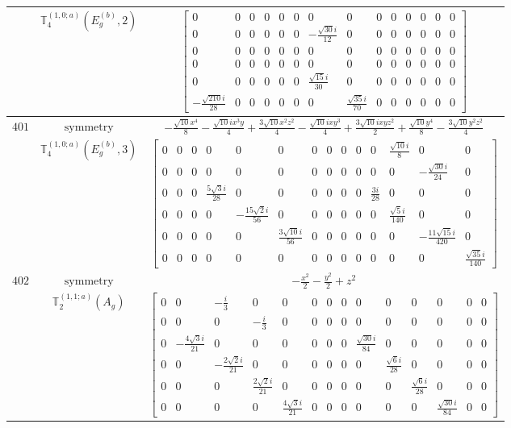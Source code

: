 \documentclass[fleqn,8pt,landscape]{jsarticle}
\begin{document}
\begin{longtable}{ccc}
$  $ & $ \mathbb{T}_{4}^{(1,0;a)}(E_{g}^{(b)},2) $ & $ \begin{bmatrix} 0 & 0 & 0 & 0 & 0 & 0 & 0 & 0 & 0 & 0 & 0 & 0 & 0 & 0 \\ 0 & 0 & 0 & 0 & 0 & 0 & - \frac{\sqrt{30} i}{12} & 0 & 0 & 0 & 0 & 0 & 0 & 0 \\ 0 & 0 & 0 & 0 & 0 & 0 & 0 & 0 & 0 & 0 & 0 & 0 & 0 & 0 \\ 0 & 0 & 0 & 0 & 0 & 0 & 0 & 0 & 0 & 0 & 0 & 0 & 0 & 0 \\ 0 & 0 & 0 & 0 & 0 & 0 & \frac{\sqrt{15} i}{30} & 0 & 0 & 0 & 0 & 0 & 0 & 0 \\ - \frac{\sqrt{210} i}{28} & 0 & 0 & 0 & 0 & 0 & 0 & \frac{\sqrt{35} i}{70} & 0 & 0 & 0 & 0 & 0 & 0 \end{bmatrix} $ \\ \hline
$ 401 $ & $ \text{symmetry} $ & $ - \frac{\sqrt{10} x^{4}}{8} - \frac{\sqrt{10} i x^{3} y}{4} + \frac{3 \sqrt{10} x^{2} z^{2}}{4} - \frac{\sqrt{10} i x y^{3}}{4} + \frac{3 \sqrt{10} i x y z^{2}}{2} + \frac{\sqrt{10} y^{4}}{8} - \frac{3 \sqrt{10} y^{2} z^{2}}{4} $ \\
$  $ & $ \mathbb{T}_{4}^{(1,0;a)}(E_{g}^{(b)},3) $ & $ \begin{bmatrix} 0 & 0 & 0 & 0 & 0 & 0 & 0 & 0 & 0 & 0 & 0 & \frac{\sqrt{10} i}{8} & 0 & 0 \\ 0 & 0 & 0 & 0 & 0 & 0 & 0 & 0 & 0 & 0 & 0 & 0 & - \frac{\sqrt{30} i}{24} & 0 \\ 0 & 0 & 0 & \frac{5 \sqrt{3} i}{28} & 0 & 0 & 0 & 0 & 0 & 0 & \frac{3 i}{28} & 0 & 0 & 0 \\ 0 & 0 & 0 & 0 & - \frac{15 \sqrt{2} i}{56} & 0 & 0 & 0 & 0 & 0 & 0 & \frac{\sqrt{5} i}{140} & 0 & 0 \\ 0 & 0 & 0 & 0 & 0 & \frac{3 \sqrt{10} i}{56} & 0 & 0 & 0 & 0 & 0 & 0 & - \frac{11 \sqrt{15} i}{420} & 0 \\ 0 & 0 & 0 & 0 & 0 & 0 & 0 & 0 & 0 & 0 & 0 & 0 & 0 & \frac{\sqrt{35} i}{140} \end{bmatrix} $ \\ \hline
$ 402 $ & $ \text{symmetry} $ & $ - \frac{x^{2}}{2} - \frac{y^{2}}{2} + z^{2} $ \\
$  $ & $ \mathbb{T}_{2}^{(1,1;a)}(A_{g}) $ & $ \begin{bmatrix} 0 & 0 & - \frac{i}{3} & 0 & 0 & 0 & 0 & 0 & 0 & 0 & 0 & 0 & 0 & 0 \\ 0 & 0 & 0 & - \frac{i}{3} & 0 & 0 & 0 & 0 & 0 & 0 & 0 & 0 & 0 & 0 \\ 0 & - \frac{4 \sqrt{3} i}{21} & 0 & 0 & 0 & 0 & 0 & 0 & \frac{\sqrt{30} i}{84} & 0 & 0 & 0 & 0 & 0 \\ 0 & 0 & - \frac{2 \sqrt{2} i}{21} & 0 & 0 & 0 & 0 & 0 & 0 & \frac{\sqrt{6} i}{28} & 0 & 0 & 0 & 0 \\ 0 & 0 & 0 & \frac{2 \sqrt{2} i}{21} & 0 & 0 & 0 & 0 & 0 & 0 & \frac{\sqrt{6} i}{28} & 0 & 0 & 0 \\ 0 & 0 & 0 & 0 & \frac{4 \sqrt{3} i}{21} & 0 & 0 & 0 & 0 & 0 & 0 & \frac{\sqrt{30} i}{84} & 0 & 0 \end{bmatrix} $ \\ \hline

\end{longtable}
\end{document}
